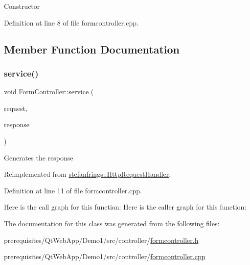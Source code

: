 Constructor 

Definition at line 8 of file formcontroller.\+cpp.



\subsection{Member Function Documentation}
\mbox{\label{class_form_controller_af327951d82e5b89df6e006c370540b7a}} 
\subsubsection{\texorpdfstring{service()}{service()}}
{\footnotesize\ttfamily void Form\+Controller\+::service (\begin{DoxyParamCaption}\item[{\mbox{\hyperlink{classstefanfrings_1_1_http_request}{Http\+Request}} \&}]{request,  }\item[{\mbox{\hyperlink{classstefanfrings_1_1_http_response}{Http\+Response}} \&}]{response }\end{DoxyParamCaption})\hspace{0.3cm}{\ttfamily [virtual]}}

Generates the response 

Reimplemented from \mbox{\hyperlink{classstefanfrings_1_1_http_request_handler_a0a7210907152c46b8b5a47feb64cf6bd}{stefanfrings\+::\+Http\+Request\+Handler}}.



Definition at line 11 of file formcontroller.\+cpp.

Here is the call graph for this function\+:
Here is the caller graph for this function\+:


The documentation for this class was generated from the following files\+:\begin{DoxyCompactItemize}
\item 
prerequisites/\+Qt\+Web\+App/\+Demo1/src/controller/\mbox{\hyperlink{formcontroller_8h}{formcontroller.\+h}}\item 
prerequisites/\+Qt\+Web\+App/\+Demo1/src/controller/\mbox{\hyperlink{formcontroller_8cpp}{formcontroller.\+cpp}}\end{DoxyCompactItemize}
